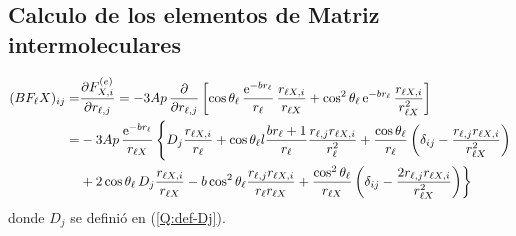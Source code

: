 \subsection{Calculo de los elementos de Matriz intermoleculares}
\label{S:elementos-matriz-intermolec}

\begin{align}
  (BF_{\ell}X)_{ij} =& \frac{\partial F^{(e)}_{X,i}}{\partial r_{\ell,j}} = -3 A p \, \frac{\partial}{\partial r_{\ell,j}} \left[{\cos {\theta_{\ell}}}\, \frac{\mathrm{e}^{-b r_{\ell}}}{r_{\ell}}\, \frac{r_{\ell X,i}}{r_{\ell X}} + {\cos^{2}{\theta_{\ell}}} \,\mathrm{e}^{-b r_{\ell}}\, \frac{r_{\ell X,i}}{r_{\ell X}^{2}} \right] \nonumber \\
                    =& -3 A p \,\frac{\mathrm{e}^{-b r_{\ell}}}{r_{\ell X}}\,\Biggl\{ D_{j} \frac{r_{\ell X,i}}{r_{\ell}} + \cos \theta_{\ell}l \frac{b r_{\ell} + 1}{r_{\ell}} \frac{r_{\ell,j} r_{\ell X,i}}{r_{\ell}^{2}} + \frac{\cos \theta_{\ell}}{r_{\ell}} \left( \delta_{ij} -  \frac{r_{\ell,j} r_{\ell X,i}}{r_{\ell X}^{2}} \right) \nonumber \\
&+ 2 \cos \theta_{\ell} \, D_{j} \frac{r_{\ell X,i}}{r_{\ell X}} - b \cos^{2}{ \theta_{\ell}} \frac{r_{\ell,j} r_{\ell X,i}}{r_{\ell} r_{\ell X}}  +  \frac{\cos^{2}{ \theta_{\ell}}}{r_{\ell X}} \left( \delta_{ij} -  \frac{2 r_{\ell,j} r_{\ell X,i}}{r_{\ell X}^{2}} \right) \biggr\}
\end{align}
donde $D_{j}$ se defini\'{o} en (\ref{Q:def-Dj}).

